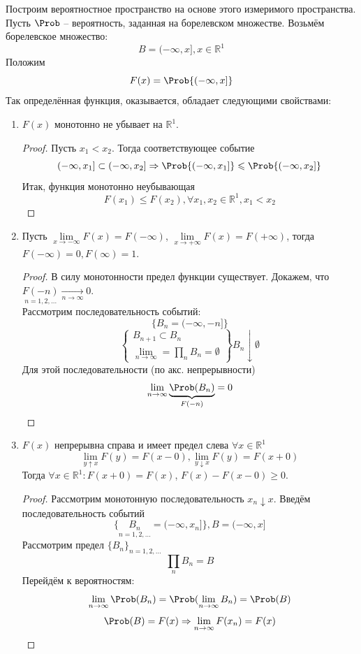 Построим вероятностное пространство на основе этого измеримого пространства. Пусть $\Prob$ -- вероятность, заданная на борелевском множестве. Возьмём борелевское множество:
\[
	B = (- \infty, x], x \in \mathbb{R}^1
\]
Положим
\begin{equation}\label{2-3-1}
	F (x) = \Prob \{ (- \infty, x] \}
\end{equation}
Так определённая функция, оказывается, обладает следующими свойствами:
\begin{enumerate}
	\item $F(x)$ монотонно не убывает на $\mathbb{R}^1$.
	      \begin{proof}
		      Пусть $x_1 < x_2$. Тогда соответствующее событие
		      \[
			      (-\infty, x_1] \subset (-\infty, x_2] \Rightarrow \Prob \{ (-\infty, x_1] \} \leqslant \Prob \{ (-\infty, x_2] \}
		      \]
		      Итак, функция монотонно неубывающая
		      \[
			      F(x_1) \leqslant F(x_2), \forall x_1, x_2 \in \mathbb{R}^1, x_1 < x_2
		      \]
	      \end{proof}
	\item Пусть $\lim\limits_{x \to -\infty} F(x) = F(-\infty)$, $\lim\limits_{x \to +\infty} F(x) = F(+\infty)$, тогда $F(-\infty) = 0, F(\infty) = 1$.
	      \begin{proof}
		      В силу монотонности предел функции существует. Докажем, что $\underset{n = 1, 2, \ldots}{F(-n)} \underset{n \to \infty}{\rightarrow} 0.$ \\
		      Рассмотрим последовательность событий:
		      \[
			      \{ B_n = (-\infty, -n] \}
		      \]
		      \[
			      \left.
			      \begin{cases}
				      B_{n+1} \subset B_n \\
				      \lim\limits_{n \to \infty} = \prod\limits_n B_n = \emptyset
			      \end{cases}
			      \right\}
			      B_n \downarrow \emptyset
		      \]
		      Для этой последовательности (по акс. непрерывности)
		      \[
			      \lim\limits_{n \to \infty} \underbrace{\Prob(B_n)}_{F(-n)} = 0
		      \]
	      \end{proof}
	\item $F(x)$ непрерывна справа и имеет предел слева $\forall x \in \mathbb{R}^1$
	      \[
		      \lim\limits_{y \uparrow x} F(y) = F(x - 0), \lim\limits_{y \downarrow x} F(y) = F(x + 0)
	      \]
	      Тогда $\forall x \in \mathbb{R}^1: F(x+0) = F(x)$, $F(x) - F(x-0) \geqslant 0$.
	      \begin{proof}
		      Рассмотрим монотонную последовательность $x_n \downarrow x$. Введём последовательность событий
		      \[
			      \{ \underset{n = 1, 2, \ldots}{B_n} = (-\infty, x_n] \}, B = (-\infty, x]
		      \]
		      Рассмотрим предел $\{ B_n \}_{n = 1, 2, \ldots}$
		      \[
			      \prod\limits_n B_n = B
		      \]
		      Перейдём к вероятностям:
		      \[
			      \lim\limits_{n \to \infty} \Prob(B_n) = \Prob(\lim\limits_{n \to \infty} B_n) = \Prob(B)
		      \]
		      \[
			      \Prob(B) = F(x) \Rightarrow \lim\limits_{n \to \infty} F(x_n) = F(x)
		      \]
	      \end{proof}
\end{enumerate}
